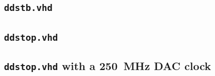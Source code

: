 \documentclass[11pt,a4paper]{article}
\renewcommand{\_}{\oldunderscore\allowbreak}
\begin{document}
\subsection{\texttt{dds\_tb.vhd}}


\subsection{\texttt{dds\_top.vhd}}


\subsection{\texttt{dds\_top.vhd} with a \SI{250}{\mega\hertz} DAC clock}\label{app:pl250}

\end{document}
